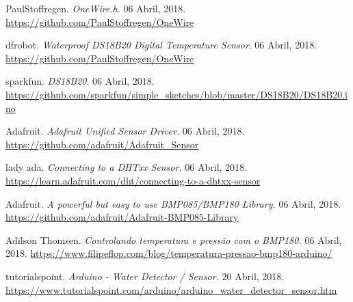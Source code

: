 \documentclass[11pt]{report}
\begin{document}
\begin{thebibliography}{2}

	 PaulStoffregen. \emph{OneWire.h}.  06 Abril, 2018. 
	\url{https://github.com/PaulStoffregen/OneWire}


	dfrobot. \emph{Waterproof DS18B20 Digital Temperature Sensor}.  06 Abril, 2018. 
	\url{https://github.com/PaulStoffregen/OneWire}


	sparkfun. \emph{DS18B20}.  06 Abril, 2018. 
	\url{https://github.com/sparkfun/simple_sketches/blob/master/DS18B20/DS18B20.ino}

	 Adafruit. \emph{Adafruit Unified Sensor Driver.}  06 Abril, 2018. 
	\url{https://github.com/adafruit/Adafruit_Sensor}

	 lady ada. \emph{Connecting to a DHTxx Sensor.}  06 Abril, 2018. 
	\url{https://learn.adafruit.com/dht/connecting-to-a-dhtxx-sensor}


	Adafruit. \emph{A powerful but easy to use BMP085/BMP180 Library.}  06 Abril, 2018. 
	\url{https://github.com/adafruit/Adafruit-BMP085-Library}


	 Adilson Thomsen. \emph{Controlando temperatura e pressão com o BMP180.}  06 Abril, 2018. 
	\url{https://www.filipeflop.com/blog/temperatura-pressao-bmp180-arduino/}

	 tutorialspoint. \emph{Arduino - Water Detector / Sensor.}  20 Abril, 2018. 
	\url{https://www.tutorialspoint.com/arduino/arduino_water_detector_sensor.htm}





	

\end{thebibliography}
\end{document}
